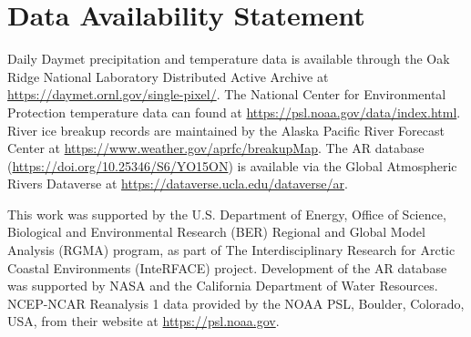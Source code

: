 \documentclass[12pts,draft]{AR_analysis_}
\begin{document}
%
%

\section*{Data Availability Statement}
Daily Daymet precipitation and temperature data is available through the Oak Ridge 
National Laboratory Distributed Active Archive at \url{https://daymet.ornl.gov/single-pixel/}.
The National Center for Environmental Protection temperature data can found at
\url{https://psl.noaa.gov/data/index.html}.
River ice breakup records are maintained by the Alaska Pacific River Forecast Center 
at \url{https://www.weather.gov/aprfc/breakupMap}. The AR database 
(\url{https://doi.org/10.25346/S6/YO15ON}) is available via the Global 
Atmospheric Rivers Dataverse at \url{https://dataverse.ucla.edu/dataverse/ar}.


\acknowledgments
This work was supported by the U.S. Department of
Energy, Office of Science, Biological and Environmental Research (BER)
Regional and Global Model Analysis (RGMA) program, as part of The 
Interdisciplinary Research for Arctic Coastal Environments (InteRFACE) 
project. Development of the AR database was supported by NASA and the 
California 
Department of Water Resources. NCEP-NCAR Reanalysis 1 data provided by the 
NOAA PSL, Boulder, Colorado, USA, from their website at 
\url{https://psl.noaa.gov}.



%
%

%



%
%
%
%
%
\end{document}
